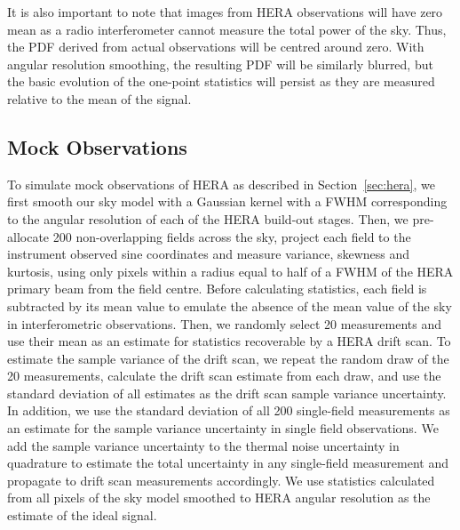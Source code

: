 \documentclass[fleqn,usenatbib]{mnras}
\begin{document}
It is also important to note that images from HERA observations will have zero mean as a radio interferometer cannot measure the total power of the sky. Thus, the PDF derived from actual observations will be centred around zero. With angular resolution smoothing, the resulting PDF will be similarly blurred, but the basic evolution of the one-point statistics will persist as they are measured relative to the mean of the signal.

\subsection{Mock Observations}
\label{sec:obs}

To simulate mock observations of HERA as described in Section~\ref{sec:hera}, we first smooth our sky model with a Gaussian kernel with a FWHM corresponding to the angular resolution of each of the HERA build-out stages. Then, we pre-allocate 200 non-overlapping fields across the sky, project each field to the instrument observed sine coordinates and measure variance, skewness and kurtosis, using only pixels within a radius equal to half of a FWHM of the HERA primary beam from the field centre. Before calculating statistics, each field is subtracted by its mean value to emulate the absence of the mean value of the sky in interferometric observations. Then, we randomly select 20 measurements and use their mean as an estimate for statistics recoverable by a HERA drift scan. To estimate the sample variance of the drift scan, we repeat the random draw of the 20 measurements, calculate the drift scan estimate from each draw, and use the standard deviation of all estimates as the drift scan sample variance uncertainty. In addition, we use the standard deviation of all 200 single-field  measurements as an estimate for the sample variance uncertainty in single field observations. We add the sample variance uncertainty to the thermal noise uncertainty in quadrature to estimate the total uncertainty in any single-field measurement and propagate to drift scan measurements accordingly.  We use statistics calculated from all pixels of the sky model smoothed to HERA angular resolution as the estimate of the ideal signal.
\end{document}

